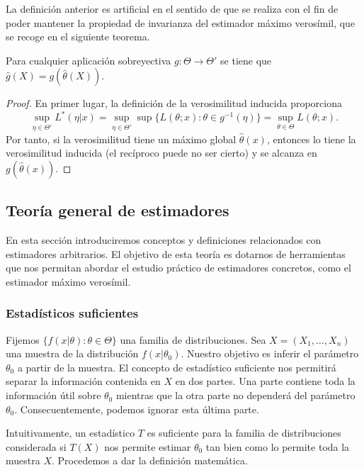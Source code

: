     La definición anterior es artificial en el sentido de que se realiza con el fin de poder mantener la propiedad de invarianza del estimador máximo verosímil, que se recoge en el siguiente teorema.

    \begin{thm}
        Para cualquier aplicación sobreyectiva $g: \Theta \to \Theta'$ se tiene que $\hat{g}(X) = g(\hat{\theta}(X))$.
    \end{thm}
    \begin{proof}
        En primer lugar, la definición de la verosimilitud inducida proporciona
        \[\sup_{\eta \in \Theta'} L^*(\eta|x) = \sup_{\eta \in \Theta'} \sup\{L(\theta ; x): \theta \in g^{-1}(\eta)\} = \sup_{\theta \in \Theta} L(\theta ; x).\]
        Por tanto, si la verosimilitud tiene un máximo global $\hat\theta(x)$, entonces lo tiene la verosimilitud inducida (el recíproco puede no ser cierto) y se alcanza en $g(\hat\theta(x))$.
    \end{proof}

    \subsection{Teoría general de estimadores}

    En esta sección introduciremos conceptos y definiciones relacionados con estimadores arbitrarios. El objetivo de esta teoría es dotarnos de herramientas que nos permitan abordar el estudio práctico de estimadores concretos, como el estimador máximo verosímil.

    \subsubsection{Estadísticos suficientes} \label{sec:estimacion:tge:sufi}

        Fijemos $\{f(x|\theta): \theta \in \Theta\}$ una familia de distribuciones. Sea $X = (X_1 , \ldots, X_n)$ una muestra de la distribución $f(x|\theta_0)$. Nuestro objetivo es inferir el parámetro $\theta_0$ a partir de la muestra. El concepto de estadístico suficiente nos permitirá separar la información contenida en $X$ en dos partes. Una parte contiene toda la información útil sobre $\theta_0$ mientras que la otra parte no dependerá del parámetro $\theta_0$. Consecuentemente, podemos ignorar esta última parte.

        Intuitivamente, un estadístico $T$ es suficiente para la familia de distribuciones considerada si $T(X)$ nos permite estimar $\theta_0$ tan bien como lo permite toda la muestra $X$. Procedemos a dar la definición matemática.

